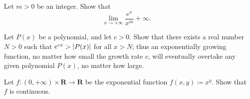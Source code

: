 \begin{exercise}\label{ex 4.5.8}
    Let \(m > 0\) be an integer.
    Show that
    \[
        \lim_{x \to +\infty} \frac{e^x}{x^m} +\infty.
    \]
\end{exercise}

\begin{exercise}\label{ex 4.5.9}
    Let \(P(x)\) be a polynomial, and let \(c > 0\).
    Show that there exists a real number \(N > 0\) such that \(e^{cx} > \abs*{P(x)}\) for all \(x > N\);
    thus an exponentially growing function, no matter how small the growth rate \(c\), will eventually overtake any given polynomial \(P(x)\), no matter how large.
\end{exercise}

\begin{exercise}\label{ex 4.5.10}
    Let \(f : (0, +\infty) \times \mathbf{R} \to \mathbf{R}\) be the exponential function \(f(x, y) \coloneqq x^y\).
    Show that \(f\) is continuous.
\end{exercise}